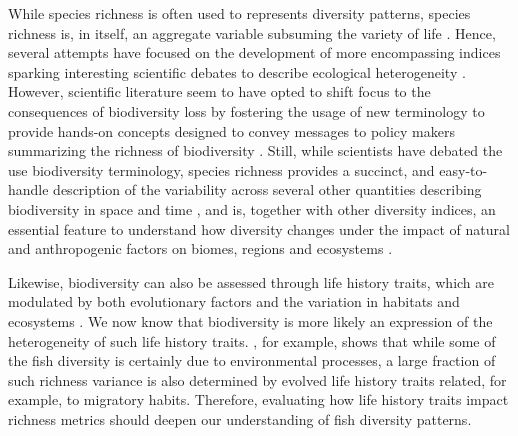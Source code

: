 \documentclass[12pt,authoryear]{elsarticle}
\begin{document}
While species richness is often used to represents diversity patterns, species richness is, in itself, an aggregate variable subsuming the variety of life \citep{Marquet2004}. Hence, several attempts have focused on the development of more encompassing indices sparking interesting scientific debates to describe ecological heterogeneity \citep{tuomisto_commentary_2011, moreno_commentary_2011, daly_ecological_2018}. However, scientific literature seem to have opted to shift focus to the consequences of biodiversity loss by fostering the usage of new terminology to provide hands-on concepts designed to convey messages to policy makers summarizing the richness of biodiversity \citep{pereira_essential_2013, butchart_global_2010}. Still, while scientists have debated the use biodiversity terminology, species richness provides a succinct, and easy-to-handle description of the variability across several other quantities describing biodiversity in space and time \citep{APPELTANS2012}, and is, together with other diversity indices, an essential feature to understand how diversity changes under the impact of natural and anthropogenic factors on biomes, regions and ecosystems \citep{troia2017, magurran2011}. 

Likewise, biodiversity can also be assessed through life history traits, which are modulated by both evolutionary factors and the variation in habitats and ecosystems \citep{neigel_book_1997, hutchings2005measuring}. We now know that biodiversity is more likely an expression of the heterogeneity of such life history traits. \citealt{alo2021macroecology}, for example, shows that while some of the fish diversity is certainly due to environmental processes, a large fraction of such richness variance is also determined by evolved life history traits related, for example, to migratory habits. Therefore, evaluating how life history traits impact richness metrics should deepen our understanding of fish diversity patterns.
\end{document}
